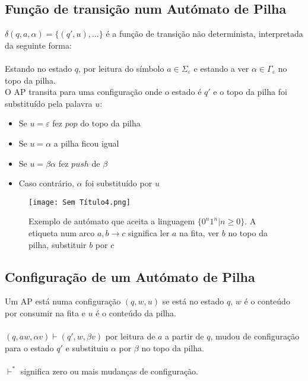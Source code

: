 \documentclass[10pt,a4paper]{report}
\begin{document}
\subsection{Função de transição num Autómato de Pilha}
$\delta (q, a, \alpha) = \{(q',u),...\}$ é a função de transição não determinista, interpretada da seguinte forma:\\
\\
Estando no estado $q$, por leitura do símbolo $a \in \Sigma_\varepsilon$ e estando a ver $\alpha \in \Gamma_\varepsilon$ no topo da pilha.\\
O AP transita para uma configuração onde o estado é $q'$ e o topo da pilha foi substituído pela palavra $u$:
\begin{itemize}
\item Se $u = \varepsilon$ fez $pop$ do topo da pilha
\item Se $u = \alpha$ a pilha ficou igual
\item Se $u = \beta\alpha$ fez $push$ de $\beta$
\item Caso contrário, $\alpha$ foi substituído por $u$
\end{itemize}
\begin{figure}[H]
\centering
\texttt{[image: Sem Título4.png]}
\caption{Exemplo de autómato que aceita a linguagem $\{0^n1^n | n \geq 0\}$.  A etiqueta num arco $a, b \rightarrow c$ significa ler $a$ na
fita, ver $b$ no topo da pilha, substituir $b$ por $c$}
\end{figure}
\subsection{Configuração de um Autómato de Pilha}
Um AP está numa configuração $(q,w,u)$ se está no estado $q$, $w$ é o conteúdo por consumir na fita e $u$ é o conteúdo da pilha.\\
\\
$(q,aw,\alpha v) \vdash (q',w,\beta v)$ por leitura de $a$ a partir de $q$, mudou de configuração para o estado $q'$ e substituiu $\alpha$ por $\beta$ no topo da pilha.\\
\\
$\vdash^*$ significa zero ou mais mudanças de configuração.
\end{document}
